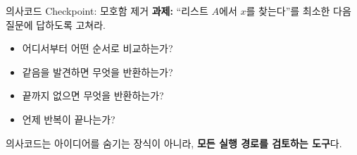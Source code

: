 \begin{frame}{의사코드 Checkpoint: 모호함 제거}
  \textbf{과제:} ``리스트 $A$에서 $x$를 찾는다''를 최소한 다음 질문에 답하도록 고쳐라.
  \begin{itemize}
    \item 어디서부터 어떤 순서로 비교하는가?
    \item 같음을 발견하면 무엇을 반환하는가?
    \item 끝까지 없으면 무엇을 반환하는가?
    \item 언제 반복이 끝나는가?
  \end{itemize}
  \begin{takeaway}
    의사코드는 아이디어를 숨기는 장식이 아니라, \textbf{모든 실행 경로를 검토하는 도구}다.
  \end{takeaway}
\end{frame}
